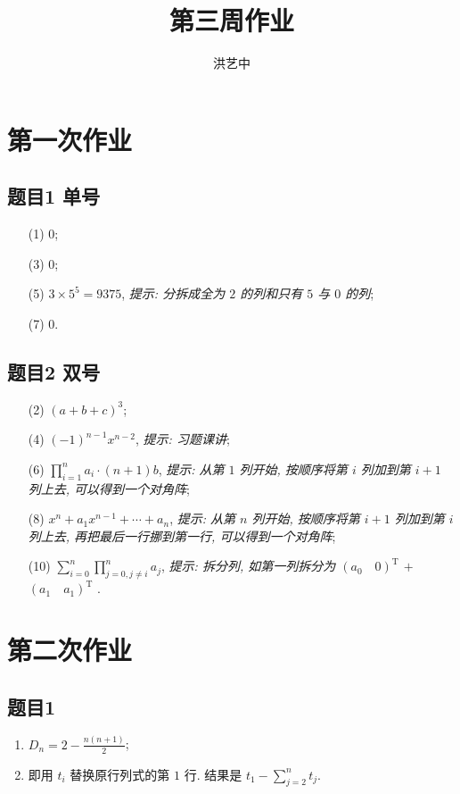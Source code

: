 \title{第三周作业}
\author{洪艺中}
\maketitle
\section{第一次作业}
\subsection*{题目1 单号}
\begin{enumerate}
    \item[(1)] 0;
    \item[(3)] 0;
    \item[(5)] $3 \times 5^5 = 9375$, \textit{提示: 分拆成全为 $2$ 的列和只有 $5$ 与 $0$ 的列};
    \item[(7)] 0. 
\end{enumerate}

\subsection*{题目2 双号}
\begin{enumerate}
    \item[(2)] $(a + b + c)^3$;
    \item[(4)] $(-1)^{n - 1}x^{n - 2}$, \textit{提示: 习题课讲};
    \item[(6)] $\displaystyle \prod_{i = 1}^{n} a_i \cdot (n + 1)b$, \textit{提示: 从第 $1$ 列开始, 按顺序将第 $i$ 列加到第 $i + 1$ 列上去, 可以得到一个对角阵};
    \item[(8)] $x^n + a_{1}x^{n - 1} + \cdots + a_n$, \textit{提示: 从第 $n$ 列开始, 按顺序将第 $i + 1$ 列加到第 $i$ 列上去, 再把最后一行挪到第一行, 可以得到一个对角阵};
    \item[(10)] $\displaystyle \sum_{i = 0}^n \prod_{j = 0, j \not= i}^{n} a_j$, \textit{提示: 拆分列, 如第一列拆分为 $(a_0 \quad 0)^{\mathrm{T}}$ $+$ $(a_1 \quad  a_1)^{\mathrm{T}}$ }.
\end{enumerate}

\section{第二次作业}
\subsection*{题目1}
\begin{enumerate}
    \item $\displaystyle D_n = 2 - \frac{n(n + 1)}{2}$;
    \item 即用 $t_i$ 替换原行列式的第 $1$ 行. 结果是 $t_1 - \sum_{j = 2}^{n} t_j$.
\end{enumerate}

